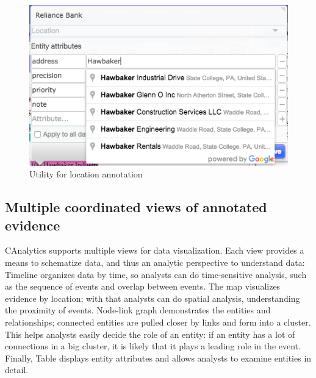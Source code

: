 \begin{figure}
	\centering
	\includegraphics[width=\columnwidth]{03-System/img/annotation-location.png}
	\caption{Utility for location annotation \label{fig:annotation-location}}
\end{figure}

\subsection{Multiple coordinated views of annotated evidence}

CAnalytics supports multiple views for data visualization. Each view provides a means to schematize data, and thus an analytic perspective to understand data:
Timeline organizes data by time, so analysts can do time-sensitive analysis, such as the sequence of events and overlap between events.  The map visualizes evidence by location; with that analysts can do spatial analysis, understanding the proximity of events.  Node-link graph demonstrates the entities and relationships; connected entities are pulled closer by links and form into a cluster. This helps analysts easily decide the role of an entity: if an entity has a lot of connections in a big cluster, it is likely that it plays a leading role in the event. Finally, Table displays entity attributes and allows analysts to examine entities in detail.  

